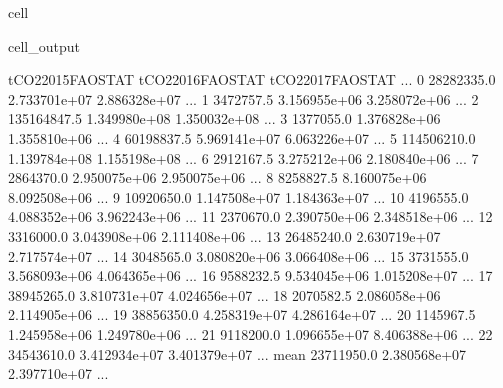 \documentclass[letterpaper,10pt,english]{jupyterBook}
\begin{document}
\begin{sphinxuseclass}{cell}
\begin{sphinxVerbatimOutput}
\begin{sphinxuseclass}{cell_output}
\begin{sphinxVerbatim}[commandchars=\\\{\}]
      tCO2\PYGZus{}2015\PYGZus{}FAOSTAT  tCO2\PYGZus{}2016\PYGZus{}FAOSTAT  tCO2\PYGZus{}2017\PYGZus{}FAOSTAT  ...  \PYGZbs{}
0            28282335.0       2.733701e+07       2.886328e+07  ...   
1             3472757.5       3.156955e+06       3.258072e+06  ...   
2           135164847.5       1.349980e+08       1.350032e+08  ...   
3             1377055.0       1.376828e+06       1.355810e+06  ...   
4            60198837.5       5.969141e+07       6.063226e+07  ...   
5           114506210.0       1.139784e+08       1.155198e+08  ...   
6             2912167.5       3.275212e+06       2.180840e+06  ...   
7             2864370.0       2.950075e+06       2.950075e+06  ...   
8             8258827.5       8.160075e+06       8.092508e+06  ...   
9            10920650.0       1.147508e+07       1.184363e+07  ...   
10            4196555.0       4.088352e+06       3.962243e+06  ...   
11            2370670.0       2.390750e+06       2.348518e+06  ...   
12            3316000.0       3.043908e+06       2.111408e+06  ...   
13           26485240.0       2.630719e+07       2.717574e+07  ...   
14            3048565.0       3.080820e+06       3.066408e+06  ...   
15            3731555.0       3.568093e+06       4.064365e+06  ...   
16            9588232.5       9.534045e+06       1.015208e+07  ...   
17           38945265.0       3.810731e+07       4.024656e+07  ...   
18            2070582.5       2.086058e+06       2.114905e+06  ...   
19           38856350.0       4.258319e+07       4.286164e+07  ...   
20            1145967.5       1.245958e+06       1.249780e+06  ...   
21            9118200.0       1.096655e+07       8.406388e+06  ...   
22           34543610.0       3.412934e+07       3.401379e+07  ...   
mean         23711950.0       2.380568e+07       2.397710e+07  ...   


\end{sphinxVerbatim}
\end{sphinxuseclass}
\end{sphinxVerbatimOutput}
\end{sphinxuseclass}
\end{document}
